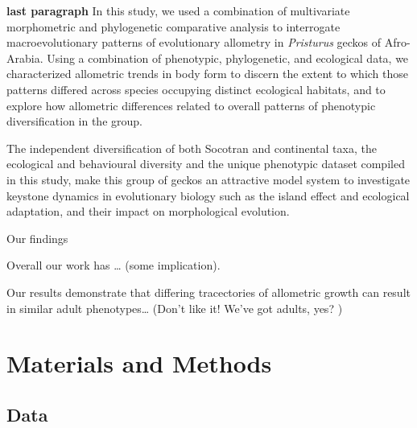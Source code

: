 \documentclass[
]{article}
\begin{document}
\textbf{last paragraph} In this study, we used a combination of
multivariate morphometric and phylogenetic comparative analysis to
interrogate macroevolutionary patterns of evolutionary allometry in
\emph{Pristurus} geckos of Afro-Arabia. Using a combination of
phenotypic, phylogenetic, and ecological data, we characterized
allometric trends in body form to discern the extent to which those
patterns differed across species occupying distinct ecological habitats,
and to explore how allometric differences related to overall patterns of
phenotypic diversification in the group.

The independent diversification of both Socotran and continental taxa,
the ecological and behavioural diversity and the unique phenotypic
dataset compiled in this study, make this group of geckos an attractive
model system to investigate keystone dynamics in evolutionary biology
such as the island effect and ecological adaptation, and their impact on
morphological evolution.

Our findings

Overall our work has \ldots{} (some implication).

Our results demonstrate that differing tracectories of allometric growth
can result in similar adult phenotypes\ldots{} (Don't like it! We've got
adults, yes? )

\hypertarget{materials-and-methods}{%
\section{Materials and Methods}\label{materials-and-methods}}

\hypertarget{data}{%
\subsection{Data}\label{data}}
\end{document}

